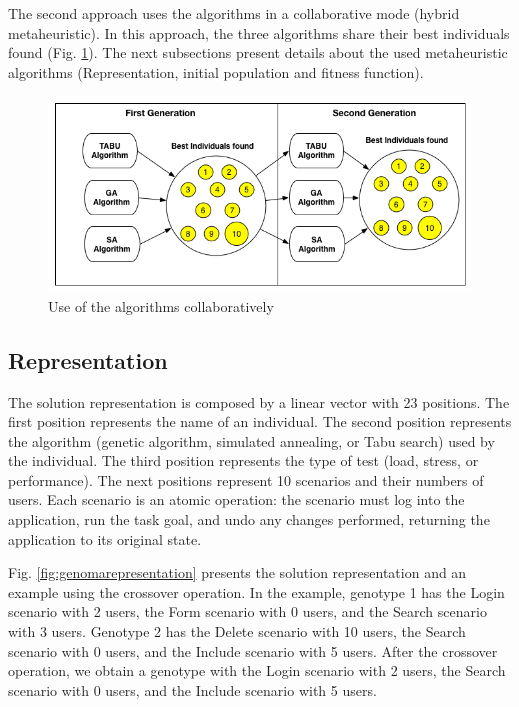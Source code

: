 The second approach uses the algorithms in a collaborative mode (hybrid metaheuristic). In this approach, the three algorithms share their best individuals found (Fig. \ref{fig:secondapproach}). The next subsections present details about the used metaheuristic algorithms (Representation, initial population and fitness function). 



\begin{figure}
\includegraphics[width=1\textwidth]{./images/collaborative.png}
\caption{Use of the  algorithms collaboratively}
\label{fig:secondapproach}
\end{figure}

\subsection{Representation}

The solution representation is composed by a linear vector with 23 positions. The first position represents the name of an individual. The second position represents the algorithm (genetic algorithm, simulated annealing, or Tabu search) used by the individual. The third position represents the type of test (load, stress, or performance). The next positions represent 10 scenarios and their numbers of users. Each scenario is an atomic operation: the scenario must log into the application, run the task goal, and undo any changes performed, returning the application to its original state.

Fig. \ref{fig:genomarepresentation} presents the solution representation and an example using the crossover operation. In the example, genotype 1 has the Login scenario with 2 users, the Form scenario with 0 users, and the Search scenario with 3 users. Genotype 2 has the Delete scenario with 10 users, the Search scenario with 0 users, and the Include scenario with 5 users. After the crossover operation, we obtain a genotype with the Login scenario with 2 users, the Search scenario with 0 users, and the Include scenario with 5 users.

